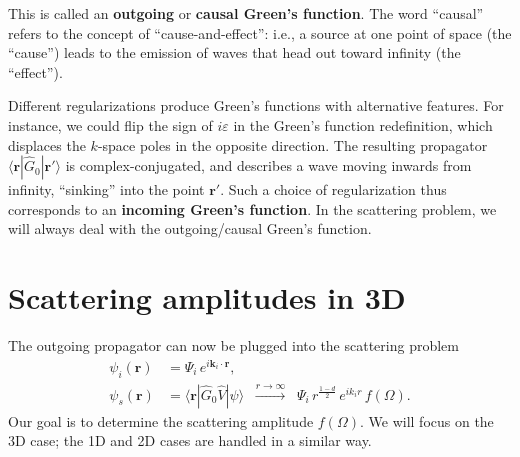 \documentclass[pra,12pt]{revtex4}
\begin{document}
This is called an \textbf{outgoing} or \textbf{causal Green's
  function}.  The word ``causal'' refers to the concept of
``cause-and-effect'': i.e., a source at one point of space (the
``cause'') leads to the emission of waves that head out toward
infinity (the ``effect'').

Different regularizations produce Green's functions with alternative
features.  For instance, we could flip the sign of $i\varepsilon$ in
the Green's function redefinition, which displaces the $k$-space poles
in the opposite direction.  The resulting propagator
$\langle\mathbf{r}|\hat{G}_0|\mathbf{r}'\rangle$ is
complex-conjugated, and describes a wave moving inwards from infinity,
``sinking'' into the point $\mathbf{r}'$.  Such a choice of
regularization thus corresponds to an \textbf{incoming Green's
  function}.  In the scattering problem, we will always deal with the
outgoing/causal Green's function.

\section{Scattering amplitudes in 3D}
\label{sec:3damp}

The outgoing propagator can now be plugged into the scattering problem
$$\begin{aligned} \psi_i(\mathbf{r}) &= \Psi_i \, e^{i\mathbf{k}_i\cdot\mathbf{r}}, \\ \psi_s(\mathbf{r}) &= \langle\mathbf{r}| \hat{G}_0 \hat{V} |\psi\rangle \;\; \overset{r\rightarrow\infty}{\longrightarrow}\;\; \Psi_i \, r^{\frac{1-d}{2}} \, e^{ik_ir} \, f(\Omega).
\end{aligned}$$
Our goal is to determine the scattering amplitude $f(\Omega)$.  We
will focus on the 3D case; the 1D and 2D cases are handled in a
similar way.
\end{document}
